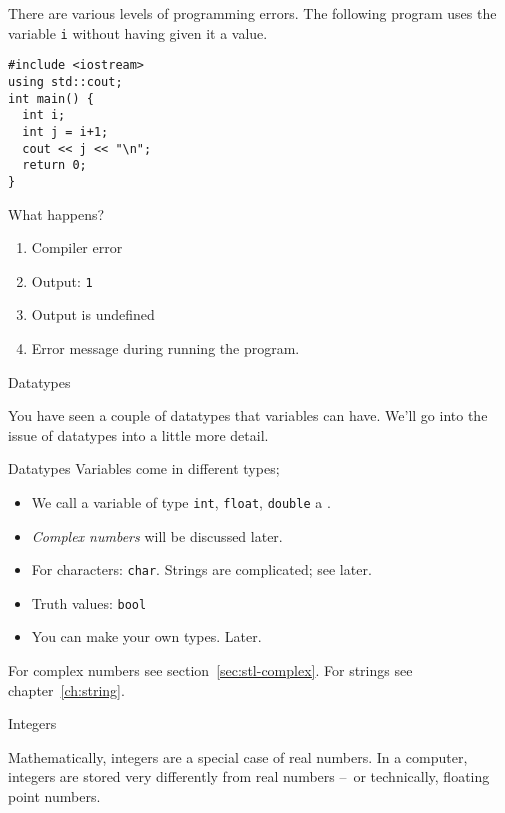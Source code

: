 There are various levels of programming errors.
The following program uses the variable \lstinline{i}
without having given it a value.

\begin{exercise}
  \label{q:initvar}
\begin{lstlisting}
#include <iostream>
using std::cout;
int main() {
  int i;
  int j = i+1;
  cout << j << "\n";
  return 0;
}
\end{lstlisting}
What happens?
\begin{enumerate}
\item Compiler error
\item Output: \lstinline{1}
\item Output is undefined
\item Error message during running the program.
\end{enumerate}
\end{exercise}

 {Datatypes}
\label{sec:ctypes}

You have seen a couple of datatypes that variables can have.
We'll go into the issue of datatypes into a little more detail.

\begin{block}{Datatypes}
  \label{sl:datatypes}
  Variables come in different types;
  \begin{itemize}
  \item We call a variable of type
    \lstinline{int}, \lstinline{float}, \lstinline{double} a .
  \item \emph{Complex numbers} will be
    discussed later.
  \item 
    For characters: \lstinline{char}. Strings are complicated; see later.
  \item Truth values: \lstinline{bool}
  \item 
    You can make your own types. Later.
  \end{itemize}
\end{block}

For complex numbers see section~\ref{sec:stl-complex}.
For strings see chapter~\ref{ch:string}.

 {Integers}

Mathematically, integers are a special case of real numbers.
In a computer, integers are stored very differently from
real numbers --~or technically, floating point numbers.

